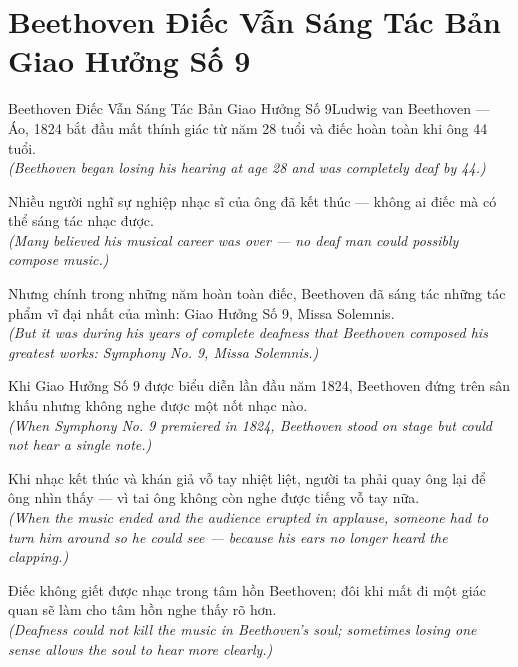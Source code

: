 \section{Beethoven Điếc Vẫn Sáng Tác Bản Giao Hưởng Số 9}
\begin{truyen}{Beethoven Điếc Vẫn Sáng Tác Bản Giao Hưởng Số 9}{Ludwig van Beethoven --- Áo, 1824}
 bắt đầu mất thính giác từ năm 28 tuổi và điếc hoàn toàn khi ông 44 tuổi.\\[4pt]
\textit{(Beethoven began losing his hearing at age 28 and was completely deaf by 44.)}

Nhiều người nghĩ sự nghiệp nhạc sĩ của ông đã kết thúc --- không ai điếc mà có thể sáng tác nhạc được.\\[4pt]
\textit{(Many believed his musical career was over --- no deaf man could possibly compose music.)}

Nhưng chính trong những năm hoàn toàn điếc, Beethoven đã sáng tác những tác phẩm vĩ đại nhất của mình: Giao Hưởng Số 9, Missa Solemnis.\\[4pt]
\textit{(But it was during his years of complete deafness that Beethoven composed his greatest works: Symphony No. 9, Missa Solemnis.)}

Khi Giao Hưởng Số 9 được biểu diễn lần đầu năm 1824, Beethoven đứng trên sân khấu nhưng không nghe được một nốt nhạc nào.\\[4pt]
\textit{(When Symphony No. 9 premiered in 1824, Beethoven stood on stage but could not hear a single note.)}

Khi nhạc kết thúc và khán giả vỗ tay nhiệt liệt, người ta phải quay ông lại để ông nhìn thấy --- vì tai ông không còn nghe được tiếng vỗ tay nữa.\\[4pt]
\textit{(When the music ended and the audience erupted in applause, someone had to turn him around so he could see --- because his ears no longer heard the clapping.)}

\end{truyen}
\begin{baihoc}
  Điếc không giết được nhạc trong tâm hồn Beethoven; đôi khi mất đi một giác quan sẽ làm cho tâm hồn nghe thấy rõ hơn.\\[4pt]
  \textit{(Deafness could not kill the music in Beethoven's soul; sometimes losing one sense allows the soul to hear more clearly.)}
\end{baihoc}


